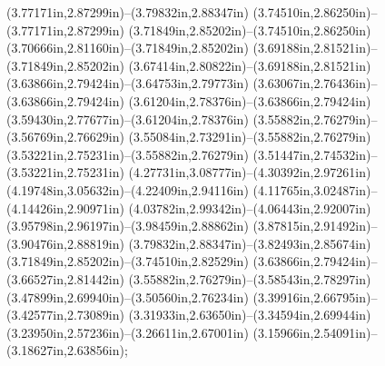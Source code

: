 (3.77171in,2.87299in)--(3.79832in,2.88347in) (3.74510in,2.86250in)--(3.77171in,2.87299in) (3.71849in,2.85202in)--(3.74510in,2.86250in) (3.70666in,2.81160in)--(3.71849in,2.85202in) (3.69188in,2.81521in)--(3.71849in,2.85202in) (3.67414in,2.80822in)--(3.69188in,2.81521in) (3.63866in,2.79424in)--(3.64753in,2.79773in) (3.63067in,2.76436in)--(3.63866in,2.79424in) (3.61204in,2.78376in)--(3.63866in,2.79424in) (3.59430in,2.77677in)--(3.61204in,2.78376in) (3.55882in,2.76279in)--(3.56769in,2.76629in) (3.55084in,2.73291in)--(3.55882in,2.76279in) (3.53221in,2.75231in)--(3.55882in,2.76279in) (3.51447in,2.74532in)--(3.53221in,2.75231in) (4.27731in,3.08777in)--(4.30392in,2.97261in) (4.19748in,3.05632in)--(4.22409in,2.94116in) (4.11765in,3.02487in)--(4.14426in,2.90971in) (4.03782in,2.99342in)--(4.06443in,2.92007in) (3.95798in,2.96197in)--(3.98459in,2.88862in) (3.87815in,2.91492in)--(3.90476in,2.88819in) (3.79832in,2.88347in)--(3.82493in,2.85674in) (3.71849in,2.85202in)--(3.74510in,2.82529in) (3.63866in,2.79424in)--(3.66527in,2.81442in) (3.55882in,2.76279in)--(3.58543in,2.78297in) (3.47899in,2.69940in)--(3.50560in,2.76234in) (3.39916in,2.66795in)--(3.42577in,2.73089in) (3.31933in,2.63650in)--(3.34594in,2.69944in) (3.23950in,2.57236in)--(3.26611in,2.67001in) (3.15966in,2.54091in)--(3.18627in,2.63856in);
